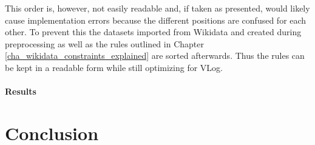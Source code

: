 \documentclass[hyperref,bachelorofscience,fleqn]{cgvpub}
\begin{document}
This order is, however, not easily readable and, if taken as presented, would likely cause implementation errors because the different positions are confused for each other. To prevent this the datasets imported from Wikidata and created during preprocessing as well as the rules outlined in Chapter \ref{cha_wikidata_constraints_explained} are sorted afterwards. Thus the rules can be kept in a readable form while still optimizing for VLog. 

\subsubsection{Results}


\chapter{Conclusion}
\end{document}

